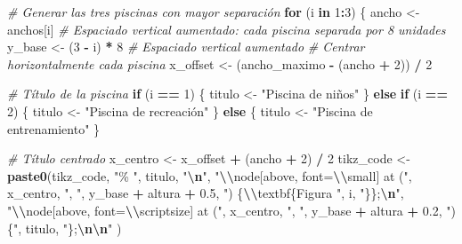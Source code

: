 \documentclass[
]{article}
\newenvironment{Shaded}{\begin{snugshade}}{\end{snugshade}}
\newcommand{\CommentTok}[1]{\textcolor[rgb]{0.56,0.35,0.01}{\textit{#1}}}
\newcommand{\ControlFlowTok}[1]{\textcolor[rgb]{0.13,0.29,0.53}{\textbf{#1}}}
\newcommand{\DecValTok}[1]{\textcolor[rgb]{0.00,0.00,0.81}{#1}}
\newcommand{\FloatTok}[1]{\textcolor[rgb]{0.00,0.00,0.81}{#1}}
\newcommand{\FunctionTok}[1]{\textcolor[rgb]{0.13,0.29,0.53}{\textbf{#1}}}
\newcommand{\NormalTok}[1]{#1}
\newcommand{\OtherTok}[1]{\textcolor[rgb]{0.56,0.35,0.01}{#1}}
\newcommand{\SpecialCharTok}[1]{\textcolor[rgb]{0.81,0.36,0.00}{\textbf{#1}}}
\newcommand{\StringTok}[1]{\textcolor[rgb]{0.31,0.60,0.02}{#1}}
\begin{document}
\begin{Shaded}
\begin{Highlighting}[]
  \CommentTok{\# Generar las tres piscinas con mayor separación}
  \ControlFlowTok{for}\NormalTok{ (i }\ControlFlowTok{in} \DecValTok{1}\SpecialCharTok{:}\DecValTok{3}\NormalTok{) \{}
\NormalTok{    ancho }\OtherTok{\textless{}{-}}\NormalTok{ anchos[i]}
    \CommentTok{\# Espaciado vertical aumentado: cada piscina separada por 8 unidades}
\NormalTok{    y\_base }\OtherTok{\textless{}{-}}\NormalTok{ (}\DecValTok{3} \SpecialCharTok{{-}}\NormalTok{ i) }\SpecialCharTok{*} \DecValTok{8}  \CommentTok{\# Espaciado vertical aumentado}
    \CommentTok{\# Centrar horizontalmente cada piscina}
\NormalTok{    x\_offset }\OtherTok{\textless{}{-}}\NormalTok{ (ancho\_maximo }\SpecialCharTok{{-}}\NormalTok{ (ancho }\SpecialCharTok{+} \DecValTok{2}\NormalTok{)) }\SpecialCharTok{/} \DecValTok{2}
    
    \CommentTok{\# Título de la piscina}
    \ControlFlowTok{if}\NormalTok{ (i }\SpecialCharTok{==} \DecValTok{1}\NormalTok{) \{}
\NormalTok{      titulo }\OtherTok{\textless{}{-}} \StringTok{"Piscina de niños"}
\NormalTok{    \} }\ControlFlowTok{else} \ControlFlowTok{if}\NormalTok{ (i }\SpecialCharTok{==} \DecValTok{2}\NormalTok{) \{}
\NormalTok{      titulo }\OtherTok{\textless{}{-}} \StringTok{"Piscina de recreación"}
\NormalTok{    \} }\ControlFlowTok{else}\NormalTok{ \{}
\NormalTok{      titulo }\OtherTok{\textless{}{-}} \StringTok{"Piscina de entrenamiento"}
\NormalTok{    \}}
    
    \CommentTok{\# Título centrado}
\NormalTok{    x\_centro }\OtherTok{\textless{}{-}}\NormalTok{ x\_offset }\SpecialCharTok{+}\NormalTok{ (ancho }\SpecialCharTok{+} \DecValTok{2}\NormalTok{) }\SpecialCharTok{/} \DecValTok{2}
\NormalTok{    tikz\_code }\OtherTok{\textless{}{-}} \FunctionTok{paste0}\NormalTok{(tikz\_code,}
      \StringTok{"\% "}\NormalTok{, titulo, }\StringTok{"}\SpecialCharTok{\textbackslash{}n}\StringTok{"}\NormalTok{,}
      \StringTok{"}\SpecialCharTok{\textbackslash{}\textbackslash{}}\StringTok{node[above, font=}\SpecialCharTok{\textbackslash{}\textbackslash{}}\StringTok{small] at ("}\NormalTok{, x\_centro, }\StringTok{", "}\NormalTok{, y\_base }\SpecialCharTok{+}\NormalTok{ altura }\SpecialCharTok{+} \FloatTok{0.5}\NormalTok{, }\StringTok{") \{}\SpecialCharTok{\textbackslash{}\textbackslash{}}\StringTok{textbf\{Figura "}\NormalTok{, i, }\StringTok{"\}\};}\SpecialCharTok{\textbackslash{}n}\StringTok{"}\NormalTok{,}
      \StringTok{"}\SpecialCharTok{\textbackslash{}\textbackslash{}}\StringTok{node[above, font=}\SpecialCharTok{\textbackslash{}\textbackslash{}}\StringTok{scriptsize] at ("}\NormalTok{, x\_centro, }\StringTok{", "}\NormalTok{, y\_base }\SpecialCharTok{+}\NormalTok{ altura }\SpecialCharTok{+} \FloatTok{0.2}\NormalTok{, }\StringTok{") \{"}\NormalTok{, titulo, }\StringTok{"\};}\SpecialCharTok{\textbackslash{}n\textbackslash{}n}\StringTok{"}
\NormalTok{    )}
    

\end{Highlighting}
\end{Shaded}
\end{document}

